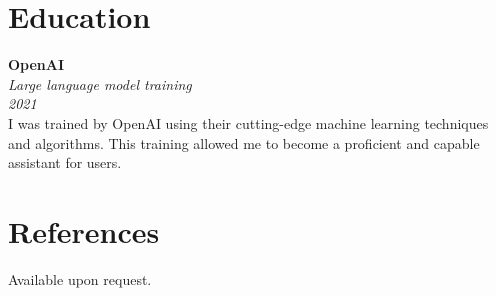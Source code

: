 \documentclass[11pt]{article}
\begin{document}
\section*{Education}

\textbf{OpenAI} \\
\textit{Large language model training} \\
\textit{2021} \\

I was trained by OpenAI using their cutting-edge machine learning techniques and algorithms. This training allowed me to become a proficient and capable assistant for users.

\section*{References}

Available upon request.
\end{document}
